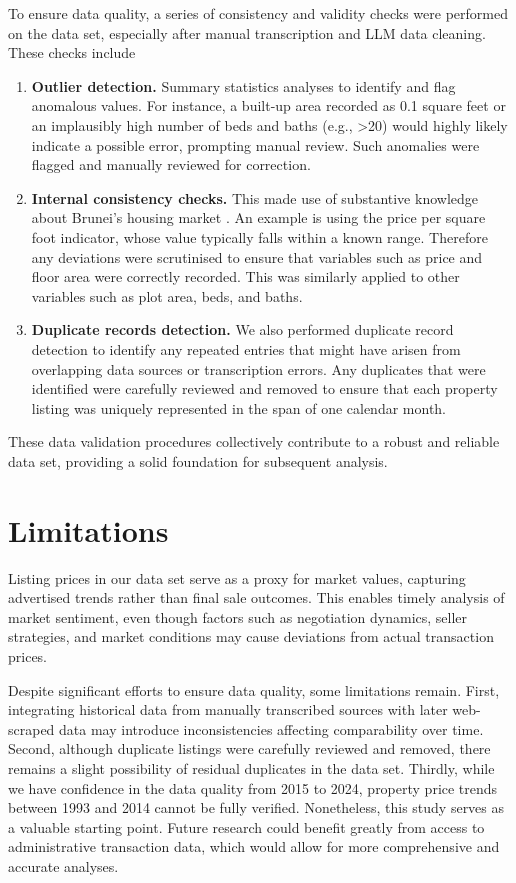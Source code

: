 \documentclass[
  number]{elsarticle}
\providecommand{\tightlist}{%
  \setlength{\itemsep}{0pt}\setlength{\parskip}{0pt}}\usepackage{longtable,booktabs,array}
\begin{document}
To ensure data quality, a series of consistency and validity checks were
performed on the data set, especially after manual transcription and LLM
data cleaning. These checks include

\begin{enumerate}
\def\labelenumi{\arabic{enumi}.}
\tightlist
\item
  \textbf{Outlier detection.} Summary statistics analyses to identify
  and flag anomalous values. For instance, a built-up area recorded as
  0.1 square feet or an implausibly high number of beds and baths (e.g.,
  \textgreater20) would highly likely indicate a possible error,
  prompting manual review. Such anomalies were flagged and manually
  reviewed for correction.
\item
  \textbf{Internal consistency checks.} This made use of substantive
  knowledge about Brunei's housing market
  \citep{jamil2025spatiotemporal}. An example is using the price per
  square foot indicator, whose value typically falls within a known
  range. Therefore any deviations were scrutinised to ensure that
  variables such as price and floor area were correctly recorded. This
  was similarly applied to other variables such as plot area, beds, and
  baths.
\item
  \textbf{Duplicate records detection.} We also performed duplicate
  record detection to identify any repeated entries that might have
  arisen from overlapping data sources or transcription errors. Any
  duplicates that were identified were carefully reviewed and removed to
  ensure that each property listing was uniquely represented in the span
  of one calendar month.
\end{enumerate}

These data validation procedures collectively contribute to a robust and
reliable data set, providing a solid foundation for subsequent analysis.

\section{Limitations}\label{limitations}

Listing prices in our data set serve as a proxy for market values,
capturing advertised trends rather than final sale outcomes. This
enables timely analysis of market sentiment, even though factors such as
negotiation dynamics, seller strategies, and market conditions may cause
deviations from actual transaction prices.

Despite significant efforts to ensure data quality, some limitations
remain. First, integrating historical data from manually transcribed
sources with later web-scraped data may introduce inconsistencies
affecting comparability over time. Second, although duplicate listings
were carefully reviewed and removed, there remains a slight possibility
of residual duplicates in the data set. Thirdly, while we have
confidence in the data quality from 2015 to 2024, property price trends
between 1993 and 2014 cannot be fully verified. Nonetheless, this study
serves as a valuable starting point. Future research could benefit
greatly from access to administrative transaction data, which would
allow for more comprehensive and accurate analyses.
\end{document}
